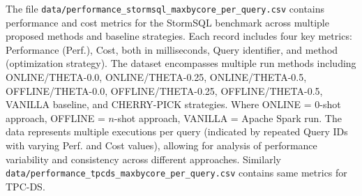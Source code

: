 The file \texttt{data/performance\_stormsql\_maxbycore\_per\_query.csv} contains performance and cost metrics for the StormSQL benchmark across multiple proposed methods and baseline strategies. Each record includes four key metrics: Performance (Perf.), Cost, both in milliseconds, Query identifier, and method (optimization strategy). The dataset encompasses multiple run methods including ONLINE/THETA-0.0, ONLINE/THETA-0.25, ONLINE/THETA-0.5, OFFLINE/THETA-0.0, OFFLINE/THETA-0.25, OFFLINE/THETA-0.5, VANILLA baseline, and CHERRY-PICK strategies. Where ONLINE = $0$-shot approach, OFFLINE = $n$-shot approach, VANILLA = Apache Spark run. The data represents multiple executions per query (indicated by repeated Query IDs with varying Perf. and Cost values), allowing for analysis of performance variability and consistency across different approaches. Similarly \texttt{data/performance\_tpcds\_maxbycore\_per\_query.csv} contains same metrics for TPC-DS.

